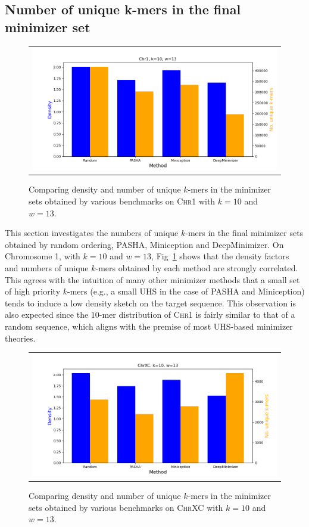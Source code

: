 \subsection{Number of unique k-mers in the final minimizer set}
\label{sec:compare_unique}
\begin{figure}[h]
\centering
\begin{tabular}{c}
\includegraphics[width=0.96\columnwidth]{minimizer_plots/compare_unique_Chr1_w13_k10.png}
\end{tabular}
\caption{Comparing density and number of unique $k$-mers in the minimizer sets obtained by various benchmarks on \textsc{Chr1} with $k=10$ and $w=13$.}
\label{app-msd-fig:5a}
\end{figure}
\noindent This section investigates the numbers of unique $k$-mers in the final minimizer sets obtained by random ordering, PASHA, Miniception and DeepMinimizer. On Chromosome 1, with $k=10$ and $w=13$, Fig~\ref{app-msd-fig:5a} shows that the density factors and numbers of unique $k$-mers obtained by each method are strongly correlated. This agrees with the intuition of many other minimizer methods that a small set of high priority $k$-mers (e.g., a small UHS in the case of PASHA and Miniception) tends to induce a low density sketch on the target sequence. This observation is also expected since the $10$-mer distribution of \textsc{Chr1} is fairly similar to that of a random sequence, which aligns with the premise of most UHS-based minimizer theories. 
\begin{figure}[h]
\centering
\begin{tabular}{c}
\includegraphics[width=0.96\columnwidth]{minimizer_plots/compare_unique_ChrXC_w13_k10.png} 
\end{tabular}
\caption{Comparing density and number of unique $k$-mers in the minimizer sets obtained by various benchmarks on \textsc{ChrXC} with $k=10$ and $w=13$.}
\label{app-msd-fig:5b}
\end{figure}


